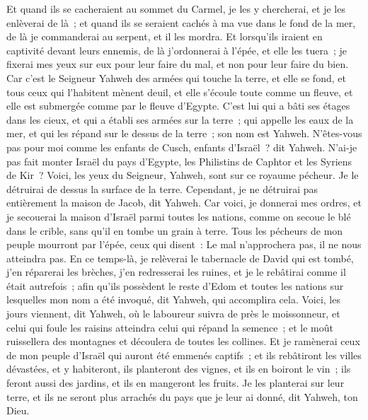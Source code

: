 \begin{multicols}{2}
Et quand ils se cacheraient au sommet du Carmel, je les y chercherai, et je les enlèverai de là~; et quand ils se seraient cachés à ma vue dans le fond de la mer, de là je commanderai au serpent, et il les mordra.
Et lorsqu'ils iraient en captivité devant leurs ennemis, de là j'ordonnerai à l'épée, et elle les tuera~; je fixerai mes yeux sur eux pour leur faire du mal, et non pour leur faire du bien.
Car c'est le Seigneur Yahweh des armées qui touche la terre, et elle se fond, et tous ceux qui l'habitent mènent deuil, et elle s'écoule toute comme un fleuve, et elle est submergée comme par le fleuve d'Egypte.
C'est lui qui a bâti ses étages dans les cieux, et qui a établi ses armées sur la terre~; qui appelle les eaux de la mer, et qui les répand sur le dessus de la terre~; son nom est Yahweh.
N'êtes-vous pas pour moi comme les enfants de Cusch, enfants d'Israël~? dit Yahweh. N'ai-je pas fait monter Israël du pays d'Egypte, les Philistins de Caphtor et les Syriens de Kir~?
Voici, les yeux du Seigneur, Yahweh, sont sur ce royaume pécheur. Je le détruirai de dessus la surface de la terre. Cependant, je ne détruirai pas entièrement la maison de Jacob, dit Yahweh.
Car voici, je donnerai mes ordres, et je secouerai la maison d'Israël parmi toutes les nations, comme on secoue le blé dans le crible, sans qu'il en tombe un grain à terre.
Tous les pécheurs de mon peuple mourront par l'épée, ceux qui disent~: Le mal n'approchera pas, il ne nous atteindra pas.
En ce temps-là, je relèverai le tabernacle de David qui est tombé, j'en réparerai les brèches, j'en redresserai les ruines, et je le rebâtirai comme il était autrefois~;
afin qu'ils possèdent le reste d'Edom et toutes les nations sur lesquelles mon nom a été invoqué, dit Yahweh, qui accomplira cela.
Voici, les jours viennent, dit Yahweh, où le laboureur suivra de près le moissonneur, et celui qui foule les raisins atteindra celui qui répand la semence~; et le moût ruissellera des montagnes et découlera de toutes les collines.
Et je ramènerai ceux de mon peuple d'Israël qui auront été emmenés captifs~; et ils rebâtiront les villes dévastées, et y habiteront, ils planteront des vignes, et ils en boiront le vin~; ils feront aussi des jardins, et ils en mangeront les fruits.
Je les planterai sur leur terre, et ils ne seront plus arrachés du pays que je leur ai donné, dit Yahweh, ton Dieu.
\PPE{}
\end{multicols}
